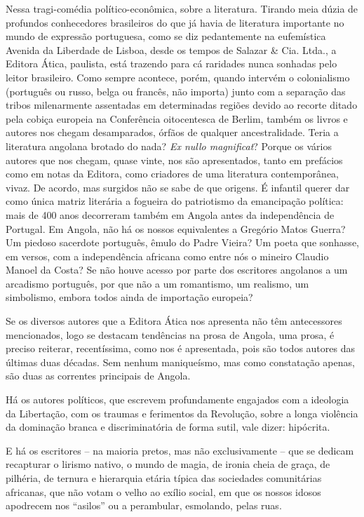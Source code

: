 \documentclass[
  letterpaper,
  DIV=11,
  numbers=noendperiod]{scrreprt}
\begin{document}
Nessa tragi-comédia político-econômica, sobre a literatura. Tirando meia
dúzia de profundos conhecedores brasileiros do que já havia de
literatura importante no mundo de expressão portuguesa, como se diz
pedantemente na eufemística Avenida da Liberdade de Lisboa, desde os
tempos de Salazar \& Cia. Ltda., a Editora Ática, paulista, está
trazendo para cá raridades nunca sonhadas pelo leitor brasileiro. Como
sempre acontece, porém, quando intervém o colonialismo (português ou
russo, belga ou francês, não importa) junto com a separação das tribos
milenarmente assentadas em determinadas regiões devido ao recorte ditado
pela cobiça europeia na Conferência oitocentesca de Berlim, também os
livros e autores nos chegam desamparados, órfãos de qualquer
ancestralidade. Teria a literatura angolana brotado do nada? \emph{Ex
nullo magnificat}? Porque os vários autores que nos chegam, quase vinte,
nos são apresentados, tanto em prefácios como em notas da Editora, como
criadores de uma literatura contemporânea, vivaz. De acordo, mas
surgidos não se sabe de que origens. É infantil querer dar como única
matriz literária a fogueira do patriotismo da emancipação política: mais
de 400 anos decorreram também em Angola antes da independência de
Portugal. Em Angola, não há os nossos equivalentes a Gregório Matos
Guerra? Um piedoso sacerdote português, êmulo do Padre Vieira? Um poeta
que sonhasse, em versos, com a independência africana como entre nós o
mineiro Claudio Manoel da Costa? Se não houve acesso por parte dos
escritores angolanos a um arcadismo português, por que não a um
romantismo, um realismo, um simbolismo, embora todos ainda de importação
europeia?

Se os diversos autores que a Editora Ática nos apresenta não têm
antecessores mencionados, logo se destacam tendências na prosa de
Angola, uma prosa, é preciso reiterar, recentíssima, como nos é
apresentada, pois são todos autores das últimas duas décadas. Sem nenhum
maniqueísmo, mas como constatação apenas, são duas as correntes
principais de Angola.

Há os autores políticos, que escrevem profundamente engajados com a
ideologia da Libertação, com os traumas e ferimentos da Revolução, sobre
a longa violência da dominação branca e discriminatória de forma sutil,
vale dizer: hipócrita.

E há os escritores -- na maioria pretos, mas não exclusivamente -- que
se dedicam recapturar o lirismo nativo, o mundo de magia, de ironia
cheia de graça, de pilhéria, de ternura e hierarquia etária típica das
sociedades comunitárias africanas, que não votam o velho ao exílio
social, em que os nossos idosos apodrecem nos ``asilos'' ou a
perambular, esmolando, pelas ruas.
\end{document}

